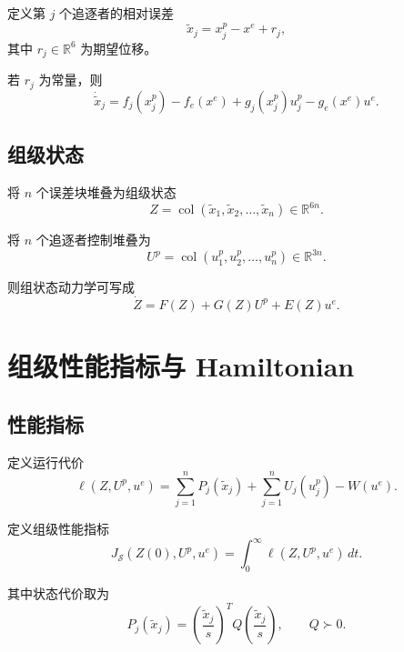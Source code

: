 \documentclass[12pt,a4paper]{ctexart}
\begin{document}
定义第 $j$ 个追逐者的相对误差
\begin{equation}
\tilde x_j = x_j^p - x^e + r_j,
\end{equation}
其中 $r_j\in\mathbb{R}^6$ 为期望位移。

若 $r_j$ 为常量，则
\begin{equation}
\dot{\tilde x}_j
=
f_j(x_j^p)-f_e(x^e)
+g_j(x_j^p)u_j^p
-g_e(x^e)u^e.
\end{equation}

\subsection{组级状态}

将 $n$ 个误差块堆叠为组级状态
\begin{equation}
Z=\operatorname{col}(\tilde x_1,\tilde x_2,\dots,\tilde x_n)\in\mathbb{R}^{6n}.
\end{equation}

将 $n$ 个追逐者控制堆叠为
\begin{equation}
U^p=\operatorname{col}(u_1^p,u_2^p,\dots,u_n^p)\in\mathbb{R}^{3n}.
\end{equation}

则组状态动力学可写成
\begin{equation}
\dot Z = F(Z)+G(Z)U^p+E(Z)u^e.
\end{equation}

\section{组级性能指标与 Hamiltonian}

\subsection{性能指标}

定义运行代价
\begin{equation}
\ell(Z,U^p,u^e)
=
\sum_{j=1}^{n}P_j(\tilde x_j)
+
\sum_{j=1}^{n}U_j(u_j^p)
-
W(u^e).
\end{equation}

定义组级性能指标
\begin{equation}
J_{\mathcal S}(Z(0),U^p,u^e)
=
\int_0^\infty \ell(Z,U^p,u^e)\,dt.
\end{equation}

其中状态代价取为
\begin{equation}
P_j(\tilde x_j)
=
\left(\frac{\tilde x_j}{s}\right)^T Q \left(\frac{\tilde x_j}{s}\right),
\qquad Q\succ 0.
\end{equation}
\end{document}
